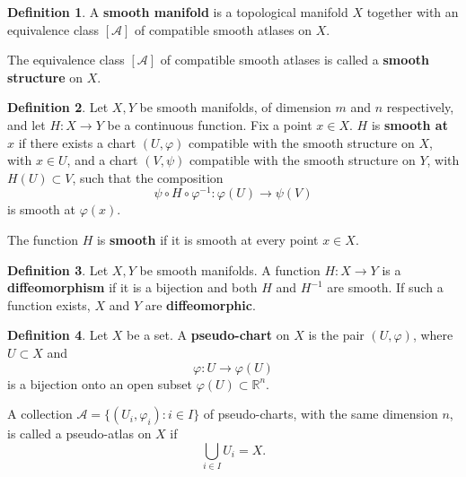 \documentclass[12pt]{article}
\theoremstyle{definition}
\newtheorem{definition}{Definition}[section]
\theoremstyle{plain}
\theoremstyle{remark}
\begin{document}
\begin{definition}\label{def:smooth-manifold}
  A \textbf{smooth manifold} is a topological manifold \( X \) together with an equivalence class \( [\mathcal{A}] \) of compatible smooth atlases on \( X \).

  The equivalence class \( [\mathcal{A}] \) of compatible smooth atlases is called a \textbf{smooth structure} on \( X \).

\end{definition}

\begin{definition}\label{def:smooth-map}
  Let \( X, Y \) be smooth manifolds, of dimension \( m \) and \( n \) respectively, and let \( H : X \longrightarrow Y \) be a continuous function.
  Fix a point \( x \in X \).
  \( H \) is \textbf{smooth at \( x \)} if there exists a chart \((U,\varphi)\) compatible with the smooth structure on \(X\), with \(x \in U\), and a chart \((V,\psi)\) compatible with the smooth structure on \(Y\), with \(H(U) \subset V\), such that the composition
  \[
    \psi \circ H \circ \varphi^{-1} : \varphi(U) \longrightarrow \psi(V)
  \]
  is smooth at \( \varphi(x) \).

  The function \( H \) is \textbf{smooth} if it is smooth at every point \( x \in X \).
\end{definition}

\begin{definition}\label{def:diffeomorphism}
  Let \( X, Y \) be smooth manifolds. A function \( H : X \longrightarrow Y \) is a \textbf{diffeomorphism} if it is a bijection and both \( H \) and \( H^{-1} \) are smooth.
  If such a function exists, \( X \) and \( Y \) are \textbf{diffeomorphic}.
\end{definition}

\begin{definition}\label{def:pseudo-chart}
  Let \(X\) be a set.
  A \textbf{pseudo-chart} on \(X\) is the pair \((U,\varphi)\), where \(U \subset X\) and
  \[
    \varphi : U \longrightarrow \varphi{(U)}
  \]
  is a bijection onto an open subset
  \(\varphi{(U)} \subset \mathbb{R}^n\).

  A collection \(\mathcal{A}=\{(U_i,\varphi_i):i\in I\}\) of pseudo-charts, with the same dimension \(n\), is called a pseudo-atlas on \(X\) if
  \[
    \bigcup_{i\in I} U_i = X.
  \]
\end{definition}
\end{document}
